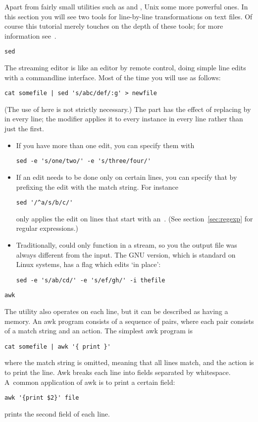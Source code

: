 Apart from fairly small utilities such as  and , Unix
some more powerful ones. In this section you will see two tools for
line-by-line transformations on text files. Of course this tutorial
merely touches on the depth of these tools; for more information
see~\cite{AWK:awk,OReilly:sedawk}.

 {\tt sed}

The streaming editor  is like an editor by remote control,
doing simple line edits with a commandline interface. Most of the time
you will use  as follows:
\begin{verbatim}
cat somefile | sed 's/abc/def/:g' > newfile
\end{verbatim}
(The use of  here is not strictly necessary.)
The  part has the effect of replacing  by 
in every line; the  modifier applies it to every instance in
every line rather than just the first.

\begin{itemize}
\item If you have more than one edit, you can specify them with
\begin{verbatim}
sed -e 's/one/two/' -e 's/three/four/'
\end{verbatim}
\item If an edit needs to be done only on certain lines, you can
  specify that by prefixing the edit with the match string. For instance
\begin{verbatim}
sed '/^a/s/b/c/'
\end{verbatim}
only applies the edit on lines that start with an~. (See
section~\ref{sec:regexp} for regular expressions.)
\item Traditionally,  could only function in a stream, so you
  the output file was always different from the input. The GNU
  version, which is standard on Linux systems, has a flag  which
  edits `in place':
\begin{verbatim}
sed -e 's/ab/cd/' -e 's/ef/gh/' -i thefile
\end{verbatim}
\end{itemize}

 {\tt awk}

The  utility also operates on each line, but it can be
described as having a memory. An awk program consists of a sequence of
pairs, where each pair consists of a match string and an action. The
simplest awk program is
\begin{verbatim}
cat somefile | awk '{ print }'
\end{verbatim}
where the match string is omitted, meaning that all lines match, and
the action is to print the line. Awk breaks each line into fields
separated by whitespace. A~common application of awk is to print a
certain field:
\begin{verbatim}
awk '{print $2}' file
\end{verbatim}
prints the second field of each line.

